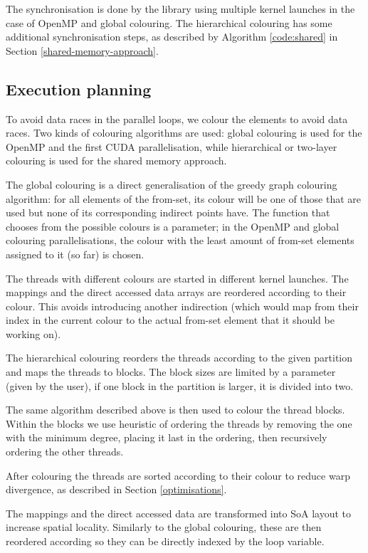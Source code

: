 The synchronisation is done by the library using multiple kernel launches in the
case of OpenMP and global colouring. The hierarchical colouring has some
additional synchronisation steps, as described by Algorithm \ref{code:shared} in
Section \ref{shared-memory-approach}.

\subsection{Execution planning}

To avoid data races in the parallel loops, we colour the elements to avoid data
races. Two kinds of colouring algorithms are used: global colouring is used for
the OpenMP and the first CUDA parallelisation, while hierarchical or two-layer
colouring is used for the shared memory approach.

The global colouring is a direct generalisation of the greedy graph colouring
algorithm: for all elements of the from-set, its colour will be one of those
that are used but none of its corresponding indirect points have. The function
that chooses from the possible colours is a parameter; in the OpenMP and global
colouring parallelisations, the colour with the least amount of from-set
elements assigned to it (so far) is chosen.

The threads with different colours are started in different kernel launches. The
mappings and the direct accessed data arrays are reordered according to their
colour. This avoids introducing another indirection (which would map from their
index in the current colour to the actual from-set element that it should be
working on).

The hierarchical colouring reorders the threads according to the given partition
and maps the threads to blocks. The block sizes are limited by a parameter
(given by the user), if one block in the partition is larger, it is divided into
two.

The same algorithm described above is then used to colour the thread blocks.
Within the blocks we use heuristic of ordering the threads by removing the one
with the minimum degree, placing it last in the ordering, then recursively
ordering the other threads.

After colouring the threads are sorted according to their colour to reduce warp
divergence, as described in Section \ref{optimisations}.

The mappings and the direct accessed data are transformed into SoA layout to
increase spatial locality. Similarly to the global colouring, these are then
reordered according so they can be directly indexed by the loop variable.

